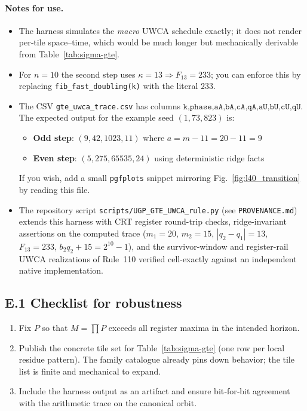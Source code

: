 \documentclass[12pt]{article}
\numberwithin{equation}{section}
\begin{document}
\paragraph{Notes for use.}
\begin{itemize}[leftmargin=1.15em]
\item The harness simulates the \emph{macro} UWCA schedule exactly; it does not render per‑tile space–time, which would be much longer but mechanically derivable from Table~\ref{tab:sigma-gte}.
\item For \(n{=}10\) the second step uses \(\kappa{=}13\Rightarrow F_{13}{=}233\); you can enforce this by replacing \texttt{fib\_fast\_doubling(k)} with the literal \(233\).
\item The CSV \texttt{gte\_uwca\_trace.csv} has columns
\(\texttt{k,phase,aA,bA,cA,qA,aU,bU,cU,qU}\). The expected output for the example seed \((1,73,823)\) is:
\begin{itemize}
\item \textbf{Odd step}: \((9,42,1023,11)\) where \(a = m-11 = 20-11 = 9\)
\item \textbf{Even step}: \((5,275,65535,24)\) using deterministic ridge facts
\end{itemize}
If you wish, add a small \texttt{pgfplots} snippet mirroring Fig.~\ref{fig:l40_transition} by reading this file.
\item The repository script \texttt{scripts/UGP\_GTE\_UWCA\_rule.py} (see \texttt{PROVENANCE.md}) extends this harness with CRT register round-trip checks, ridge-invariant assertions on the computed trace ($m_1{=}20$, $m_2{=}15$, $|q_2-q_1|{=}13$, $F_{13}{=}233$, $b_2q_2+15=2^{10}-1$), and the survivor-window and register-rail UWCA realizations of Rule~110 verified cell-exactly against an independent native implementation.
\end{itemize}

\subsection*{E.1  Checklist for robustness}
\begin{enumerate}[label=(\alph*), itemsep=2pt]
\item Fix \(P\) so that \(M=\prod P\) exceeds all register maxima in the intended horizon.
\item Publish the concrete tile set for Table~\ref{tab:sigma-gte} (one row per local residue pattern). The family catalogue already pins down behavior; the tile list is finite and mechanical to expand.
\item Include the harness output as an artifact and ensure bit‑for‑bit agreement with the arithmetic trace on the canonical orbit.
\end{enumerate}
\end{document}
